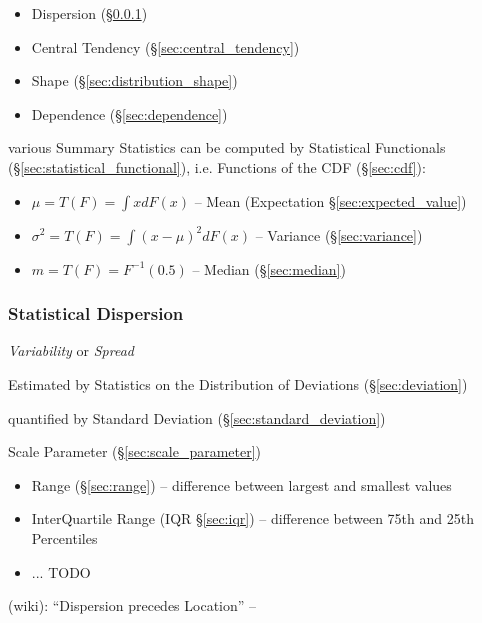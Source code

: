 
\begin{itemize}
  \item Dispersion (\S\ref{sec:dispersion})
  \item Central Tendency (\S\ref{sec:central_tendency})
  \item Shape (\S\ref{sec:distribution_shape})
  \item Dependence (\S\ref{sec:dependence})
\end{itemize}

various Summary Statistics can be computed by Statistical Functionals
(\S\ref{sec:statistical_functional}), i.e. Functions of the CDF
(\S\ref{sec:cdf}):
\begin{itemize}
  \item $\mu = T(F) = \int x dF(x)$
    -- Mean (Expectation \S\ref{sec:expected_value})
  \item $\sigma^2 = T(F) = \int (x - \mu)^2 dF(x)$
    -- Variance (\S\ref{sec:variance})
  \item $m = T(F) = F^{-1}(0.5)$
    -- Median (\S\ref{sec:median})
\end{itemize}



\subsubsection{Statistical Dispersion}\label{sec:dispersion}

\emph{Variability} or \emph{Spread}

Estimated by Statistics on the Distribution of Deviations
(\S\ref{sec:deviation})

quantified by Standard Deviation (\S\ref{sec:standard_deviation})

\fist Scale Parameter (\S\ref{sec:scale_parameter})

\begin{itemize}
  \item Range (\S\ref{sec:range}) -- difference between largest and smallest
    values
  \item InterQuartile Range (IQR \S\ref{sec:iqr}) -- difference between 75th and
    25th Percentiles
  \item ... TODO
\end{itemize}

(wiki): ``Dispersion precedes Location'' --


